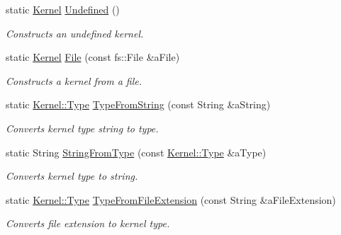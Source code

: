 \begin{DoxyCompactItemize}
\item 
static \hyperlink{classlibrary_1_1physics_1_1env_1_1ephem_1_1spice_1_1_kernel}{Kernel} \hyperlink{classlibrary_1_1physics_1_1env_1_1ephem_1_1spice_1_1_kernel_a36f572782b1ee7faa26b905694575a1c}{Undefined} ()
\begin{DoxyCompactList}\small\item\em Constructs an undefined kernel. \end{DoxyCompactList}\item 
static \hyperlink{classlibrary_1_1physics_1_1env_1_1ephem_1_1spice_1_1_kernel}{Kernel} \hyperlink{classlibrary_1_1physics_1_1env_1_1ephem_1_1spice_1_1_kernel_a6950d514a1f5aff297cbba398a87e88a}{File} (const fs\+::\+File \&a\+File)
\begin{DoxyCompactList}\small\item\em Constructs a kernel from a file. \end{DoxyCompactList}\item 
static \hyperlink{classlibrary_1_1physics_1_1env_1_1ephem_1_1spice_1_1_kernel_ab28fd08b98057f635ee6a0e75b59fae6}{Kernel\+::\+Type} \hyperlink{classlibrary_1_1physics_1_1env_1_1ephem_1_1spice_1_1_kernel_adbe0aa20c41a728b73c1ef340568c61a}{Type\+From\+String} (const String \&a\+String)
\begin{DoxyCompactList}\small\item\em Converts kernel type string to type. \end{DoxyCompactList}\item 
static String \hyperlink{classlibrary_1_1physics_1_1env_1_1ephem_1_1spice_1_1_kernel_aa39fc387e6e3024749029545d74650c9}{String\+From\+Type} (const \hyperlink{classlibrary_1_1physics_1_1env_1_1ephem_1_1spice_1_1_kernel_ab28fd08b98057f635ee6a0e75b59fae6}{Kernel\+::\+Type} \&a\+Type)
\begin{DoxyCompactList}\small\item\em Converts kernel type to string. \end{DoxyCompactList}\item 
static \hyperlink{classlibrary_1_1physics_1_1env_1_1ephem_1_1spice_1_1_kernel_ab28fd08b98057f635ee6a0e75b59fae6}{Kernel\+::\+Type} \hyperlink{classlibrary_1_1physics_1_1env_1_1ephem_1_1spice_1_1_kernel_a3fabea66b53ad83db460854728a5be38}{Type\+From\+File\+Extension} (const String \&a\+File\+Extension)
\begin{DoxyCompactList}\small\item\em Converts file extension to kernel type. \end{DoxyCompactList}\end{DoxyCompactItemize}


